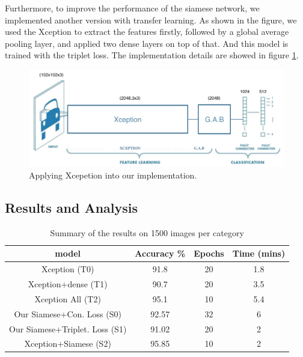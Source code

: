 Furthermore, to improve the performance of the siamese network, we implemented another version with transfer learning. As shown in the figure, we used the Xception to extract the features firstly, followed by a global average pooling layer, and applied two dense layers on top of that. And this model is trained with the triplet loss. The implementation details are showed in figure \ref{fig:xception_cnn}. 

\begin{figure}[h]
  \centering
  \includegraphics[width=\linewidth]{figs/xception_cnn.png}
  \caption{Applying  Xcepetion into our implementation.}
  \label{fig:xception_cnn}
\end{figure}

\subsection{Results and Analysis}

\begin{table}[ht]
    \caption{Summary of the results on 1500 images per category} 
    \centering 
    \begin{tabular}{c c c c} 
    \hline\hline 
    
    model & Accuracy \% & Epochs & Time (mins)  \\%
    \hline %
    Xception (T0) & 91.8 & 20 & 1.8 \\%
    Xception+dense (T1) & 90.7 & 20 & 3.5 \\%
    Xception All (T2) & 95.1 & 10 & 5.4 \\%
    Our Siamese+Con. Loss (S0) & 92.57 & 32 & 6 \\%
    Our Siamese+Triplet. Loss (S1) & 91.02  & 20& 2 \\%
    Xception+Siamese (S2) & 95.85 & 10 & 2 \\%
    \hline 
    \end{tabular}
\label{table:data} %
\end{table}

